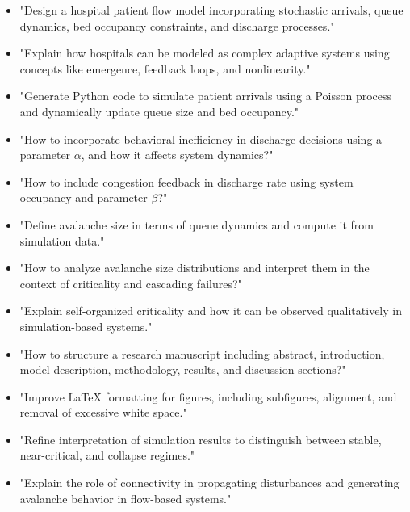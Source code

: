 \documentclass[11pt]{article}
\begin{document}
\begin{itemize}


\item "Design a hospital patient flow model incorporating stochastic arrivals, queue dynamics, bed occupancy constraints, and discharge processes."

\item "Explain how hospitals can be modeled as complex adaptive systems using concepts like emergence, feedback loops, and nonlinearity."

\item "Generate Python code to simulate patient arrivals using a Poisson process and dynamically update queue size and bed occupancy."

\item "How to incorporate behavioral inefficiency in discharge decisions using a parameter $\alpha$, and how it affects system dynamics?"

\item "How to include congestion feedback in discharge rate using system occupancy and parameter $\beta$?"

\item "Define avalanche size in terms of queue dynamics and compute it from simulation data."

\item "How to analyze avalanche size distributions and interpret them in the context of criticality and cascading failures?"

\item "Explain self-organized criticality and how it can be observed qualitatively in simulation-based systems."

\item "How to structure a research manuscript including abstract, introduction, model description, methodology, results, and discussion sections?"

\item "Improve LaTeX formatting for figures, including subfigures, alignment, and removal of excessive white space."

\item "Refine interpretation of simulation results to distinguish between stable, near-critical, and collapse regimes."

\item "Explain the role of connectivity in propagating disturbances and generating avalanche behavior in flow-based systems."

\end{itemize}
\end{document}
